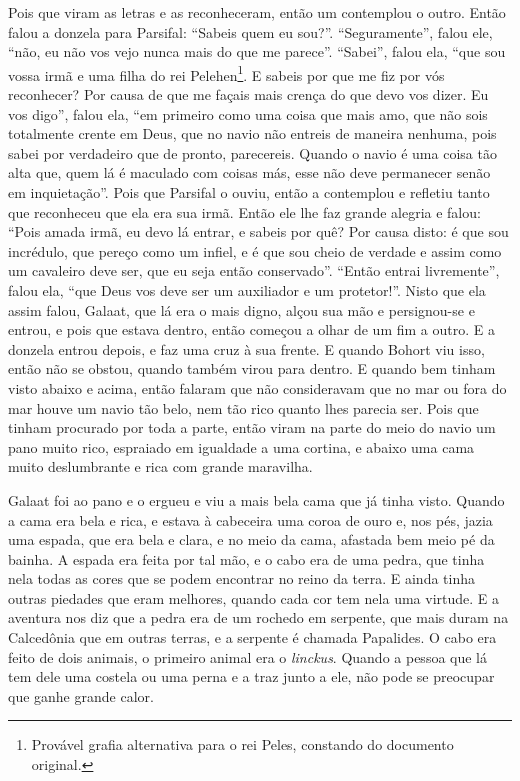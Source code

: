 Pois que viram as letras e as reconheceram, então um contemplou o outro. Então
falou a donzela para Parsifal: “Sabeis quem eu sou?”. “Seguramente”, falou
ele, “não, eu não vos vejo nunca mais do que me parece”. “Sabei”, falou ela,
“que sou vossa irmã e uma filha do rei Pelehen\footnote{ Provável grafia
alternativa para o rei Peles, constando do documento original.}. E
sabeis por que me fiz por vós reconhecer? Por causa de que me façais mais
crença do que devo vos dizer. Eu vos digo”, falou ela, “em primeiro como uma
coisa que mais amo, que não sois totalmente crente em Deus, que no navio não
entreis de maneira nenhuma, pois sabei por verdadeiro que de pronto,
parecereis. Quando o navio é uma coisa tão alta que, quem lá é maculado com
coisas más, esse não deve permanecer senão em inquietação”.
Pois que Parsifal o ouviu, então a contemplou e refletiu tanto que reconheceu
que ela era sua irmã. Então ele lhe faz grande alegria e falou: “Pois amada
irmã, eu devo lá entrar, e sabeis por quê? Por causa disto: é que sou
incrédulo, que pereço como um infiel, e é que sou cheio de verdade e assim como
um cavaleiro deve ser, que eu seja então conservado”. “Então entrai
livremente”, falou ela, “que Deus vos deve ser um auxiliador e um protetor!”.
Nisto que ela assim falou, Galaat, que lá era o mais digno, alçou sua mão e
persignou-se e entrou, e pois que estava dentro, então começou a olhar de um
fim a outro. E a donzela entrou depois, e faz uma cruz à sua frente. E quando
Bohort viu isso, então não se obstou, quando também virou para dentro. E quando
bem tinham visto abaixo e acima, então falaram que não consideravam que no mar
ou fora do mar houve um navio tão belo, nem tão rico quanto lhes parecia ser.
Pois que tinham procurado por toda a parte, então viram na parte do meio do
navio um pano muito rico, espraiado em igualdade a uma cortina, e abaixo uma
cama muito deslumbrante e rica com grande maravilha.

Galaat foi ao pano e o ergueu e viu a mais bela cama que já tinha visto. Quando
a cama era bela e rica, e estava à cabeceira uma coroa de ouro e, nos pés,
jazia uma espada, que era bela e clara, e no meio da cama, afastada bem meio pé
da bainha. A espada era feita por tal mão, e o cabo era de uma pedra, que tinha
nela todas as cores que se podem encontrar no reino da terra. E ainda tinha
outras piedades que eram melhores, quando cada cor tem nela uma virtude. E a
aventura nos diz que a pedra era de um rochedo em serpente, que mais duram na
Calcedônia que em outras terras, e a serpente é chamada Papalides. O
cabo era feito de dois animais, o primeiro animal era o \textit{linckus}.
Quando a pessoa que lá tem dele uma costela ou uma perna e a traz junto a ele,
não pode se preocupar que ganhe grande calor.

